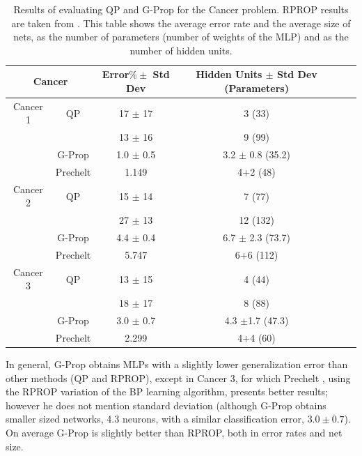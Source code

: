 \documentclass{elsart}
\begin{document}
\begin{table}
\begin{center}
\begin{tabular}{|c|c|c|c|c|c|}
\hline 
\multicolumn{2}{|c|}{Cancer} & Error$\% \pm$ Std Dev & Hidden Units $\pm$ Std Dev (Parameters)  \\
\hline
\hline
Cancer 1 &   QP     & 17  $\pm$ 17  &   3 (33)  \\
         &          & 13  $\pm$ 16  &   9 (99)  \\
\cline{2-4}
         &   G-Prop &  1.0  $\pm$ 0.5   &  3.2 $\pm$ 0.8 (35.2)  \\
\cline{2-4}
         & Prechelt & 1.149             &   4+2 (48)  \\ %
\hline
\hline
Cancer 2 &   QP     & 15  $\pm$ 14  &  7 (77)   \\
         &          & 27  $\pm$ 13  & 12 (132)  \\
\cline{2-4}
         &   G-Prop & 4.4   $\pm$ 0.4   & 6.7 $\pm$ 2.3 (73.7)  \\
\cline{2-4}
         & Prechelt & 5.747             &  6+6 (112)  \\ %
\hline
\hline
Cancer 3 &   QP     & 13 $\pm$ 15   &   4 (44)  \\
         &          & 18  $\pm$ 17  &   8 (88)  \\
\cline{2-4}
         &   G-Prop & 3.0   $\pm$ 0.7   & 4.3 $\pm$1.7 (47.3)  \\
\cline{2-4}
         & Prechelt & 2.299             & 4+4 (60)  \\ %
\hline

\end{tabular}
\end{center}
\caption{\small{Results of evaluating QP and G-Prop for the Cancer problem. RPROP results are taken from \cite{Prechelt94c}. This table shows the average error rate and the average size of nets, as the number of parameters (number of weights of the MLP) and as the number of hidden units.}}
\label{table:cancer}
\end{table}

In general, G-Prop obtains MLPs with a slightly lower generalization error than other methods (QP and RPROP), except in Cancer 3, for which Prechelt \cite{Prechelt94c}, using the RPROP variation of the BP learning algorithm, presents better results; however he does not mention standard deviation (although G-Prop obtains smaller sized networks, 4.3 neurons, with a similar classification error, $3.0 \pm 0.7$). On average G-Prop is slightly better than RPROP, both in error rates and net size.
\end{document}
